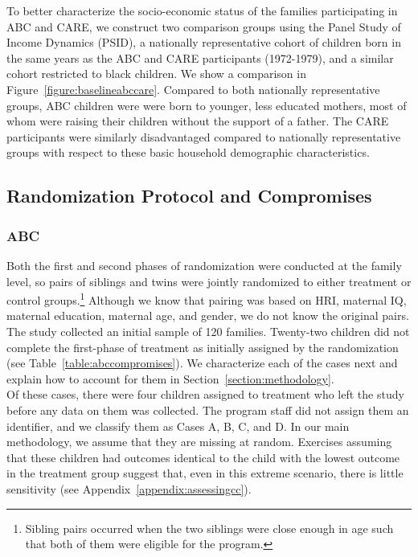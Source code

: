 \noindent To better characterize the socio-economic status of the families participating in ABC and CARE, we construct two comparison groups using the Panel Study of Income Dynamics (PSID), a nationally representative cohort of children born in the same years as the ABC and CARE participants (1972-1979), and a similar cohort restricted to black children. We show a comparison in Figure~\ref{figure:baselineabccare}. Compared to both nationally representative groups, ABC children were were born to younger, less educated mothers, most of whom were raising their children without the support of a father. The CARE participants were similarly disadvantaged compared to nationally representative groups with respect to these basic household demographic characteristics.\\

\subsection{Randomization Protocol and Compromises} \label{section:randomization}

\subsubsection{ABC}

\noindent Both the first and second phases of randomization were conducted at the family level, so pairs of siblings and twins were jointly randomized to either treatment or control groups.\footnote{Sibling pairs occurred when the two siblings were close enough in age such that both of them were eligible for the program.} Although we know that pairing was based on HRI, maternal IQ, maternal education, maternal age, and gender, we do not know the original pairs. The study collected an initial sample of 120 families. Twenty-two children did not complete the first-phase of treatment as initially assigned by the randomization (see Table~\ref{table:abccompromises}). We characterize each of the cases next and explain how to account for them in Section~\ref{section:methodology}.\\

\noindent Of these cases, there were four children assigned to treatment who left the study before any data on them was collected. The program staff did not assign them an identifier, and we classify them as Cases A, B, C, and D. In our main methodology, we assume that they are missing at random. Exercises assuming that these children had outcomes identical to the child with the lowest outcome in the treatment group suggest that, even in this extreme scenario, there is little sensitivity (see Appendix~\ref{appendix:assessingcc}).\\

